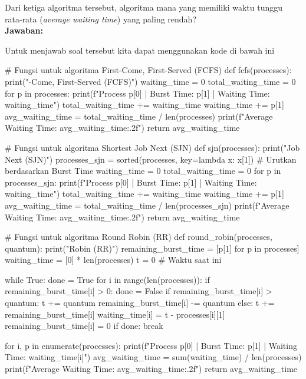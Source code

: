\documentclass[12pt]{article}
\begin{document}
        \noindent Dari ketiga algoritma tersebut, algoritma mana yang memiliki waktu tunggu rata-rata (\textit{average waiting time}) yang paling rendah?\\

        \noindent \textbf{Jawaban: }

        \noindent Untuk menjawab soal tersebut kita dapat menggunakan kode di bawah ini
        \begin{python}
        # Fungsi untuk algoritma First-Come, First-Served (FCFS)
        def fcfs(processes):
    print("\nFirst-Come, First-Served (FCFS)")
    waiting_time = 0
    total_waiting_time = 0
    for p in processes:
        print(f"Process {p[0]} | Burst Time: {p[1]} | Waiting Time: {waiting_time}")
        total_waiting_time += waiting_time
        waiting_time += p[1]
    avg_waiting_time = total_waiting_time / len(processes)
    print(f"Average Waiting Time: {avg_waiting_time:.2f}")
    return avg_waiting_time

# Fungsi untuk algoritma Shortest Job Next (SJN)
def sjn(processes):
    print("\nShortest Job Next (SJN)")
    processes_sjn = sorted(processes, key=lambda x: x[1])  # Urutkan berdasarkan Burst Time
    waiting_time = 0
    total_waiting_time = 0
    for p in processes_sjn:
        print(f"Process {p[0]} | Burst Time: {p[1]} | Waiting Time: {waiting_time}")
        total_waiting_time += waiting_time
        waiting_time += p[1]
    avg_waiting_time = total_waiting_time / len(processes_sjn)
    print(f"Average Waiting Time: {avg_waiting_time:.2f}")
    return avg_waiting_time

# Fungsi untuk algoritma Round Robin (RR)
def round_robin(processes, quantum):
    print("\nRound Robin (RR)")
    remaining_burst_time = [p[1] for p in processes]
    waiting_time = [0] * len(processes)
    t = 0  # Waktu saat ini

    while True:
        done = True
        for i in range(len(processes)):
            if remaining_burst_time[i] > 0:
                done = False
                if remaining_burst_time[i] > quantum:
                    t += quantum
                    remaining_burst_time[i] -= quantum
                else:
                    t += remaining_burst_time[i]
                    waiting_time[i] = t - processes[i][1]
                    remaining_burst_time[i] = 0
        if done:
            break

    for i, p in enumerate(processes):
        print(f"Process {p[0]} | Burst Time: {p[1]} | Waiting Time: {waiting_time[i]}")
    avg_waiting_time = sum(waiting_time) / len(processes)
    print(f"Average Waiting Time: {avg_waiting_time:.2f}")
    return avg_waiting_time


\end{python}
\end{document}
